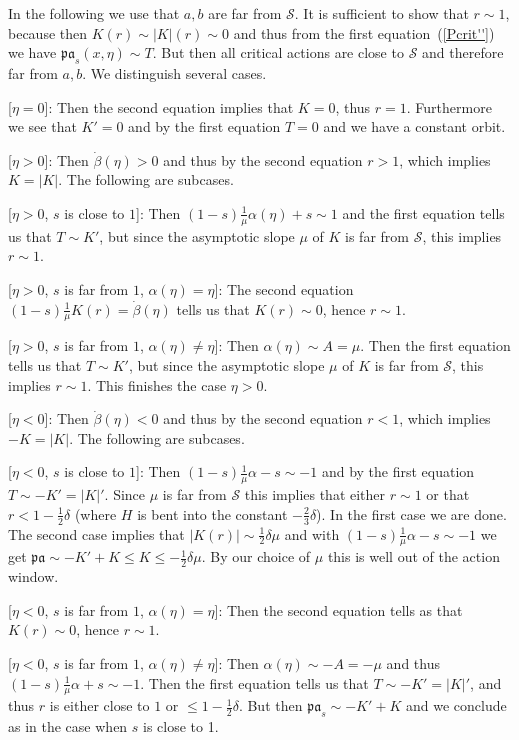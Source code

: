 \documentclass{amsart}
\newcommand{\Scal}{{\mathcal{S}}}
\newcommand{\pacal}{\mathfrak{pa}}
\theoremstyle{definition}
\theoremstyle{remark}
\numberwithin{equation}{section}
\begin{document}
In the following we use that $a,b$ are far from $\Scal$. It is sufficient to show that $r\sim 1$, because then $K(r)\sim |K|(r)\sim 0$ and thus from the first equation~(\ref{Pcrit''}) we have $\pacal_s(x,\eta)\sim T$. But then all critical actions are close to $\Scal$ and therefore far from $a,b$. We distinguish several cases.

[$\eta=0$]: Then the second equation implies that $K=0$, thus $r=1$. Furthermore we see that $K'=0$ and by the first equation $T=0$ and we have a constant orbit.

[$\eta>0$]: Then $\dot\beta(\eta)>0$ and thus by the second equation $r>1$, which implies $K=|K|$. The following are subcases.

[$\eta>0$, $s$ is close to $1$]: Then $(1-s)\frac1\mu\alpha(\eta)+s\sim1$ and the first equation tells us that $T\sim K'$, but since the asymptotic slope $\mu$ of $K$ is far from $\Scal$, this implies $r\sim1$.

[$\eta>0$, $s$ is far from $1$, $\alpha(\eta)=\eta$]: The second equation $(1-s)\frac1\mu K(r)=\dot\beta(\eta)$ tells us that $K(r)\sim 0$, hence $r\sim 1$.

[$\eta>0$, $s$ is far from $1$, $\alpha(\eta)\neq\eta$]: Then $\alpha(\eta)\sim A=\mu$. Then the first equation tells us that $T\sim K'$, but since the asymptotic slope $\mu$ of $K$ is far from $\Scal$, this implies $r\sim 1$. This finishes the case $\eta>0$.

[$\eta<0$]: Then $\dot\beta(\eta)<0$ and thus by the second equation $r<1$, which implies $-K=|K|$. The following are subcases.

[$\eta<0$, $s$ is close to $1$]: Then $(1-s)\frac1\mu\alpha-s\sim-1$ and by the first equation $T\sim -K'=|K|'$. Since $\mu$ is far from $\Scal$ this implies that either $r\sim 1$ or that $r<1-\frac12\delta$ (where $H$ is bent into the constant $-\frac23\delta$). In the first case we are done. The second case implies that $|K(r)|\sim \frac12\delta\mu$ and with $(1-s)\frac1\mu\alpha-s\sim-1$ we get $\pacal\sim -K'+K\leq K\leq-\frac12\delta\mu$. By our choice of $\mu$ this is well out of the action window.

[$\eta<0$, $s$ is far from $1$, $\alpha(\eta)=\eta$]: Then the second equation tells as that $K(r)\sim 0$, hence $r\sim 1$. 

[$\eta<0$, $s$ is far from $1$, $\alpha(\eta)\neq\eta$]: Then $\alpha(\eta)\sim -A=-\mu$ and thus $(1-s)\frac1\mu\alpha+s\sim -1$. Then the first equation tells us that $T\sim -K'=|K|'$, and thus $r$ is either close to $1$ or $\leq 1-\frac12\delta$. But then $\pacal_s\sim -K'+K$ and we conclude as in the case when $s$ is close to 1.
\end{document}
